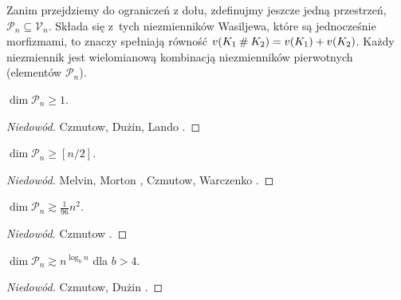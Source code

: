 Zanim przejdziemy do ograniczeń z dołu, zdefinujmy jeszcze jedną przestrzeń, $\mathcal P_n \subseteq \mathcal V_n$.
Składa się z~tych niezmienników Wasiljewa, które są jednocześnie morfizmami, to znaczy spełniają równość $v(K_1 \mathbin{\#} K_2) = v(K_1) + v(K_2)$.
Każdy niezmiennik jest wielomianową kombinacją niezmienników pierwotnych (elementów $\mathcal P_n$).

\begin{proposition}
    $\dim \mathcal P_n \ge 1$.
\end{proposition}

\begin{proof}[Niedowód]
%
%
%
    Czmutow, Dużin, Lando \cite{duzhin1994}.
\end{proof}

\begin{proposition}
    $\dim \mathcal P_n \ge [n/2]$.
\end{proposition}

\begin{proof}[Niedowód]
%
%
%
%
    Melvin, Morton \cite{melvin1995}, Czmutow, Warczenko \cite{varchenko1997}.
\end{proof}

\begin{proposition}
    $\dim \mathcal P_n \gtrsim \frac{1}{96} n^2$.
\end{proposition}

\begin{proof}[Niedowód]
%
    Czmutow \cite{duzhin1996}.
\end{proof}

\begin{proposition}
    $\dim \mathcal P_n \gtrsim n^{\log_b n}$ dla $b > 4$.
\end{proposition}

\begin{proof}[Niedowód]
%
%
    Czmutow, Dużin \cite{duzhin1999}.
\end{proof}

